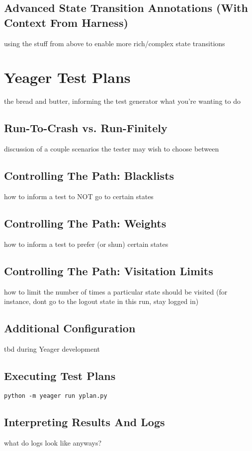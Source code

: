 \subsection{Advanced State Transition Annotations (With Context From Harness)}
using the stuff from above to enable more rich/complex state transitions %

\section{Yeager Test Plans}
the bread and butter, informing the test generator what you're wanting to do %

\subsection{Run-To-Crash vs. Run-Finitely}
discussion of a couple scenarios the tester may wish to choose between %

\subsection{Controlling The Path: Blacklists}
how to inform a test to NOT go to certain states %

\subsection{Controlling The Path: Weights}
how to inform a test to prefer (or shun) certain states %

\subsection{Controlling The Path: Visitation Limits}
how to limit the number of times a particular state should be visited (for instance, dont go to the logout state in this run, stay logged in) %

\subsection{Additional Configuration}
tbd during Yeager development %

\subsection{Executing Test Plans}
\texttt{python -m yeager run yplan.py} %

\subsection{Interpreting Results And Logs}
what do logs look like anyways? %
